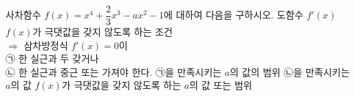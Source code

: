 사차함수 $f(x)=x^4+\dfrac{2}{3}x^3-ax^2-1$에 대하여 다음을 구하시오. 
 도함수 $f'(x)$
 $f(x)$가 극댓값을 갖지 않도록 하는 조건\\ \hspace*{1em}$\Rightarrow$ 삼차방정식 $f'(x)=0$이\\ \hspace*{2em}㉠ 한 실근과 두  갖거나\\ \hspace*{2em}㉡ 한 실근과 중근 또는  가져야 한다.
 ㉠을 만족시키는 $a$의 값의 범위
 ㉡을 만족시키는 $a$의 값
 $f(x)$가 극댓값을 갖지 않도록 하는 $a$의 값 또는 범위
